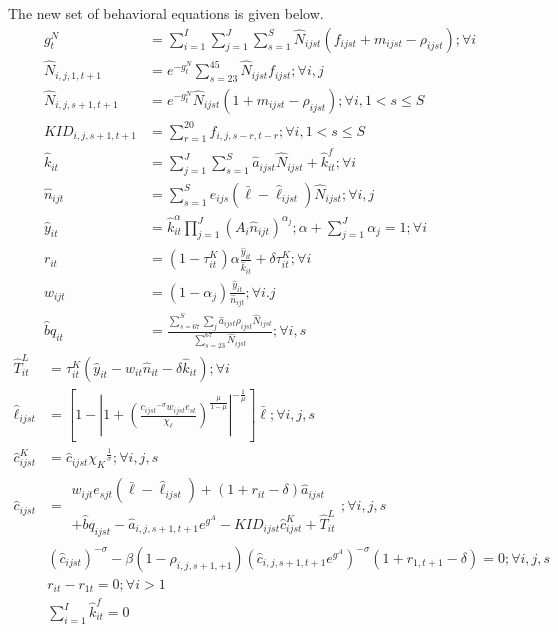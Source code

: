 \documentclass[letterpaper,12pt]{article}
\theoremstyle{definition}
\numberwithin{equation}{section}
\begin{document}
\begin{spacing}{1.5}
	The new set of behavioral equations is given below.
	\begin{align}
		g^N_t & = \sum_{i=1}^I \sum_{j=1}^J \sum_{s=1}^S \hat N_{ijst} (f_{ijst}+m_{ijst}-\rho_{ijst}) ; \forall i\\
		\hat N_{i,j,1,t+1} & = e^{-g^N_t}\sum_{s=23}^{45} \hat N_{ijst} f_{ijst} ; \forall i,j\\
		\hat N_{i,j,s+1,t+1} & = e^{-g^N_t}\hat N_{ijst} (1+m_{ijst}-\rho_{ijst}); \forall i, 1<s\le S \\
		KID_{i,j,s+1,t+1} & = \sum_{r=1}^{20} f_{i,j,s-r,t-r}; \forall i, 1<s\le S \\
	    \hat k_{it} & = \sum_{j=1}^J \sum_{s=1}^S \hat a_{ijst} \hat N_{ijst} + \hat k_{it}^f; \forall i \\
		\hat n_{ijt} & = \sum_{s=1}^S e_{ijs} (\bar \ell - \hat \ell_{ijst}) \hat N_{ijst}; \forall i,j \\
		\hat y_{it} & = \hat k_{it}^\alpha \prod_{j=1}^J \left( A_{i} \hat n_{ijt} \right)^{\alpha_j}; \alpha + \sum_{j=1}^J \alpha_j = 1 ; \forall i \\
		r_{it} & = (1-\tau^K_{it})\alpha \frac{\hat y_{it}}{\hat k_{it}} + \delta \tau^K_{it}; \forall i \\
		w_{ijt} & = (1-\alpha_j) \frac{\hat y_{it}}{\hat n_{ijt}}; \forall i.j \\
		\hat bq_{it} & = \frac{\sum_{s=67}^S \sum_j \hat a_{ijst} \rho_{ijst} \hat N_{ijst}}{\sum_{s=23}^{67} \hat N_{ijst}} ; \forall i,s
	\end{align}
	\begin{align}
		\hat T^L_{it} & = \tau^K_{it} (\hat y_{it} - w_{it}\hat n_{it} - \delta \hat k_{it}); \forall i \\
    	\hat \ell_{ijst} & = \left[ 1 - \left| 1 + \left( \frac{{c_{ijst}}^{-\sigma} w_{ijst} e_{st}}{\chi_\ell} \right)^{\frac{\mu}{1-\mu}} \right|^{-\frac{1}{\mu}} \right] \bar \ell; \forall i,j,s\label{eq_6elldef} \\
		\hat c^K_{ijst} & = \hat c_{ijst} {\chi_K}^{\frac{1}{\sigma}}; \forall i,j,s \label{eq_6cKdef} \\
		\hat c_{ijst} & = \begin{matrix} w_{ijt} e_{sjt} (\bar \ell - \hat \ell_{ijst}) + (1+r_{it}-\delta)\hat a_{ijst} \\ +\hat bq_{ijst} - \hat a_{i,j,s+1,t+1} e^{g^A} - {KID}_{ijst} \hat c^K_{ijst} + \hat T^L_{it} \end{matrix}; \forall i,j,s \label{eq_6BC} \\
		& \left({\hat c_{ijst}}\right)^{-\sigma} - \beta (1-\rho_{i,j,s+1,+1}) \left(\hat c_{i,j,s+1,t+1} e^{g^A}\right)^{-\sigma}(1+r_{1,t+1}-\delta) = 0; \forall i,j,s \\
		& r_{it} - r_{1t} = 0; \forall i>1 \\
		& \sum_{i=1}^I \hat k^f_{it} = 0
	\end{align}

\end{spacing}

\newpage

\end{document}
